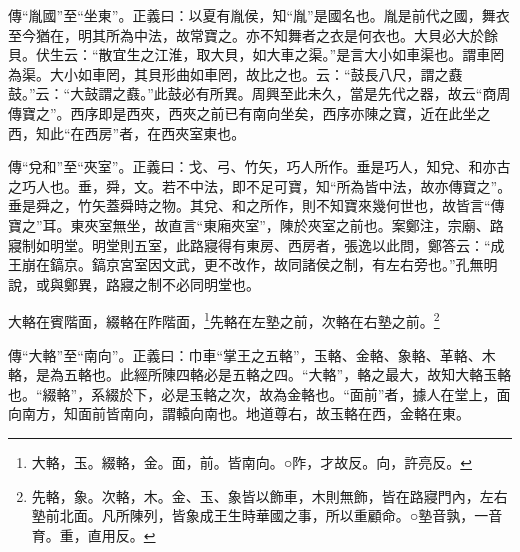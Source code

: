 {\noindent\zhuan{}\fzbyks 傳“胤國”至“坐東”。正義曰：以夏有胤侯，知“胤”是國名也。胤是前代之國，舞衣至今猶在，明其所為中法，故常寶之。亦不知舞者之衣是何衣也。大貝必大於餘貝。伏生云：“散宜生之江淮，取大貝，如大車之渠。”是言大小如車渠也。謂車罔為渠。大小如車罔，其貝形曲如車罔，故比之也。云：“鼓長八尺，謂之鼖鼓。”云：“大鼓謂之鼖。”此鼓必有所異。周興至此未久，當是先代之器，故云“商周傳寶之”。西序即是西夾，西夾之前已有南向坐矣，西序亦陳之寶，近在此坐之西，知此“在西房”者，在西夾室東也。 \par}

{\noindent\zhuan{}\fzbyks 傳“兌和”至“夾室”。正義曰：戈、弓、竹矢，巧人所作。垂是巧人，知兌、和亦古之巧人也。垂，舜，文。若不中法，即不足可寶，知“所為皆中法，故亦傳寶之”。垂是舜之，竹矢蓋舜時之物。其兌、和之所作，則不知寶來幾何世也，故皆言“傳寶之”耳。東夾室無坐，故直言“東廂夾室”，陳於夾室之前也。案鄭注，宗廟、路寢制如明堂。明堂則五室，此路寢得有東房、西房者，張逸以此問，鄭答云：“成王崩在鎬京。鎬京宮室因文武，更不改作，故同諸侯之制，有左右旁也。”孔無明說，或與鄭異，路寢之制不必同明堂也。 \par}

大輅在賓階面，綴輅在阼階面，\footnote{大輅，玉。綴輅，金。面，前。皆南向。○阼，才故反。向，許亮反。}先輅在左塾之前，次輅在右塾之前。\footnote{先輅，象。次輅，木。金、玉、象皆以飾車，木則無飾，皆在路寢門內，左右塾前北面。凡所陳列，皆象成王生時華國之事，所以重顧命。○塾音孰，一音育。重，直用反。}

{\noindent\zhuan{}\fzbyks 傳“大輅”至“南向”。正義曰：巾車“掌王之五輅”，玉輅、金輅、象輅、革輅、木輅，是為五輅也。此經所陳四輅必是五輅之四。“大輅”，輅之最大，故知大輅玉輅也。“綴輅”，系綴於下，必是玉輅之次，故為金輅也。“面前”者，據人在堂上，面向南方，知面前皆南向，謂轅向南也。地道尊右，故玉輅在西，金輅在東。 \par}

